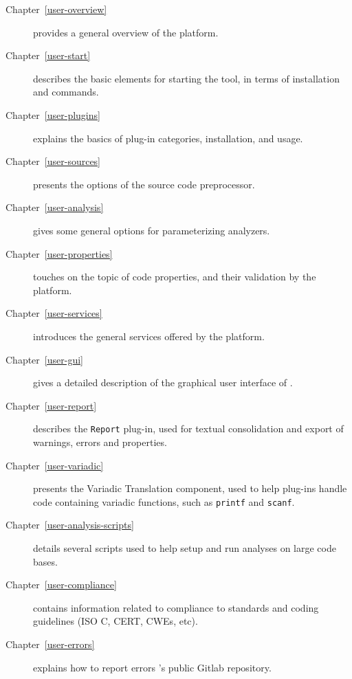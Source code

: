 \begin{description}
\item[Chapter~\ref{user-overview}] provides a general overview of the platform.
\item[Chapter~\ref{user-start}] describes the basic elements for starting the
  tool, in terms of installation and commands.
\item[Chapter~\ref{user-plugins}] explains the basics of plug-in categories,
  installation, and usage.
\item[Chapter~\ref{user-sources}] presents the options of the source code
  preprocessor.
\item[Chapter~\ref{user-analysis}] gives some general options for parameterizing
  analyzers.
\item[Chapter~\ref{user-properties}] touches on the topic of code properties,
  and their validation by the platform.
\item[Chapter~\ref{user-services}] introduces the general services offered by
  the platform.
\item[Chapter~\ref{user-gui}] gives a detailed description of the graphical
  user interface of \FramaC.
\item[Chapter~\ref{user-report}] describes the \texttt{Report} plug-in, used
  for textual consolidation and export of warnings, errors and properties.
\item[Chapter~\ref{user-variadic}] presents the Variadic Translation component,
  used to help plug-ins handle code containing variadic
  functions, such as \texttt{printf} and \texttt{scanf}.
\item[Chapter~\ref{user-analysis-scripts}] details several scripts used to
  help setup and run analyses on large code bases.
\item[Chapter~\ref{user-compliance}] contains information related to compliance
  to standards and coding guidelines (ISO C, CERT, CWEs, etc).
\item[Chapter~\ref{user-errors}] explains how to report errors \via \FramaC's
  public Gitlab repository.
\end{description}
